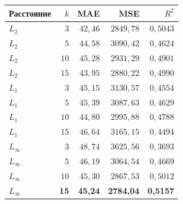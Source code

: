 \begin{tabular}{lrrrr}
\toprule
Расстояние & $k$ & MAE & MSE & $R^2$ \\
\midrule
$L_2$ & $3$ & $42{,}46$ & $2849{,}78$ & $0{,}5043$ \\
$L_2$ & $5$ & $44{,}58$ & $3090{,}42$ & $0{,}4624$ \\
$L_2$ & $10$ & $45{,}28$ & $2931{,}29$ & $0{,}4901$ \\
$L_2$ & $15$ & $43{,}95$ & $2880{,}22$ & $0{,}4990$ \\
$L_1$ & $3$ & $45{,}15$ & $3130{,}57$ & $0{,}4554$ \\
$L_1$ & $5$ & $45{,}39$ & $3087{,}63$ & $0{,}4629$ \\
$L_1$ & $10$ & $44{,}80$ & $2995{,}88$ & $0{,}4788$ \\
$L_1$ & $15$ & $46{,}64$ & $3165{,}15$ & $0{,}4494$ \\
$L_\infty$ & $3$ & $48{,}74$ & $3625{,}56$ & $0{,}3693$ \\
$L_\infty$ & $5$ & $46{,}19$ & $3064{,}54$ & $0{,}4669$ \\
$L_\infty$ & $10$ & $45{,}30$ & $2867{,}53$ & $0{,}5012$ \\
$L_\infty$ & \textbf{15} & \textbf{45,24} & \textbf{2784,04} & \textbf{0,5157} \\
\bottomrule
\end{tabular}
